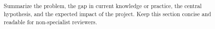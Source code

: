 \documentclass{article}
\title{\vspace{\TitleTopVSpace}\textbf{\AbstractTitle}\\[0.5em]
\normalsize \ApplicantName\\
\normalsize \ApplicantAffiliation}
\begin{document}
\maketitle
\vspace{\StandaloneTitleBottomVSpace}

\begin{abstract}

Summarize the problem, the gap in current knowledge or practice, the
central hypothesis, and the expected impact of the project. Keep this
section concise and readable for non-specialist reviewers.

\end{abstract}
\end{document}
